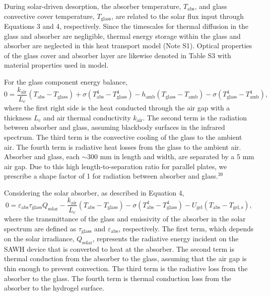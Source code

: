 \documentclass[11pt]{article}
\begin{document}
During solar-driven desorption, the absorber temperature, $T_{\mathrm{abs}}$, and glass convective cover temperature, $T_{\mathrm{glass}}$, are related to the solar flux input through Equations 3 and 4, respectively. Since the timescales for thermal diffusion in the glass and absorber are negligible, thermal energy storage within the glass and absorber are neglected in this heat transport model (Note S1). Optical properties of the glass cover and absorber layer are likewise denoted in Table S3 with material properties used in model.

For the glass component energy balance,
\begin{equation}
0 = \frac{k_{\mathrm{air}}}{L_{c}}\left(T_{\mathrm{abs}} - T_{\mathrm{glass}}\right) + \sigma\left(T_{\mathrm{abs}}^{4} - T_{\mathrm{glass}}^{4}\right) - h_{\mathrm{amb}}\left(T_{\mathrm{glass}} - T_{\mathrm{amb}}\right) - \sigma\left(T_{\mathrm{glass}}^{4} - T_{\mathrm{amb}}^{4}\right),
\end{equation}
where the first right side is the heat conducted through the air gap with a thickness $L_{c}$ and air thermal conductivity $k_{\mathrm{air}}$. The second term is the radiation between absorber and glass, assuming blackbody surfaces in the infrared spectrum. The third term is the convective cooling of the glass to the ambient air. The fourth term is radiative heat losses from the glass to the ambient air. Absorber and glass, each $\sim$300 mm in length and width, are separated by a 5 mm air gap. Due to this high length-to-separation ratio for parallel plates, we prescribe a shape factor of 1 for radiation between absorber and glass.$^{39}$

Considering the solar absorber, as described in Equation 4,
\begin{equation}
0 = \varepsilon_{\mathrm{abs}}\tau_{\mathrm{glass}}Q_{\mathrm{solar}} - \frac{k_{\mathrm{air}}}{L_{c}}\left(T_{\mathrm{abs}} - T_{\mathrm{glass}}\right) - \sigma\left(T_{\mathrm{abs}}^{4} - T_{\mathrm{glass}}^{4}\right) - U_{\mathrm{gel}}\left(T_{\mathrm{abs}} - T_{\mathrm{gel,s}}\right),
\end{equation}
where the transmittance of the glass and emissivity of the absorber in the solar spectrum are defined as $\tau_{\mathrm{glass}}$ and $\varepsilon_{\mathrm{abs}}$, respectively. The first term, which depends on the solar irradiance, $Q_{\mathrm{solar}}$, represents the radiative energy incident on the SAWH device that is converted to heat at the absorber. The second term is thermal conduction from the absorber to the glass, assuming that the air gap is thin enough to prevent convection. The third term is the radiative loss from the absorber to the glass. The fourth term is thermal conduction loss from the absorber to the hydrogel surface.
\end{document}
